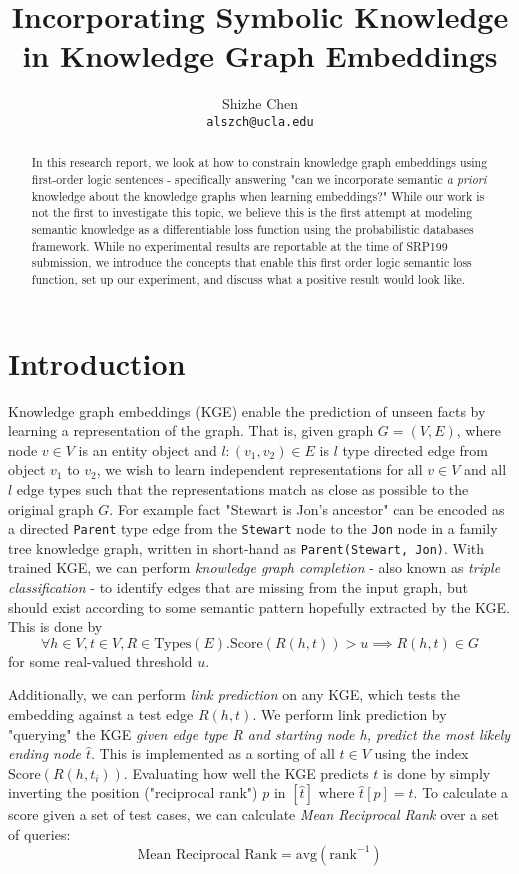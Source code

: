 \documentclass{article}
\title{Incorporating Symbolic Knowledge in Knowledge Graph Embeddings}
\author{%
  Shizhe Chen \\
  \texttt{alszch@ucla.edu} \\
}
\begin{document}
\maketitle

\begin{abstract}
    In this research report, we look at how to constrain knowledge graph
    embeddings using first-order logic sentences - specifically answering "can
    we incorporate semantic \textit{a priori} knowledge about the knowledge
    graphs when learning embeddings?" While our work is not the first to
    investigate this topic, we believe this is the first attempt at modeling
    semantic knowledge as a differentiable loss function using the probabilistic
    databases framework. While no experimental results are reportable at the
    time of SRP199 submission, we introduce the concepts that enable this first
    order logic semantic loss function, set up our experiment, and discuss what
    a positive result would look like.
\end{abstract}

\section{Introduction}
\label{Introduction}

Knowledge graph embeddings (KGE) enable the prediction of unseen facts by
learning a representation of the graph. That is, given graph \(G = (V, E)\),
where node \(v \in V\) is an entity object and \(l: (v_1, v_2) \in E\) is \(l\)
type directed edge from object \(v_1\) to \(v_2\), we wish to learn
independent representations for all \(v \in V\) and all \(l\) edge types such
that the representations match as close as possible to the original graph \(G\).
For example fact "Stewart is Jon's ancestor" can be encoded as a
directed \texttt{Parent} type edge from the \texttt{Stewart} node to the
\texttt{Jon} node in a family tree knowledge graph, written in short-hand as
\texttt{Parent(Stewart, Jon)}. With trained KGE, we can perform
\textit{knowledge graph completion} - also known as \textit{triple
classification} - to identify edges that are missing from the input graph, but
should exist according to some semantic pattern hopefully extracted by the KGE.
This is done by 
\[ \forall h \in V, t \in V, R \in \textrm{Types}(E).
    \textrm{Score}(R(h, t)) > u  \implies R(h, t) \in G \]
for some real-valued threshold \(u\).

Additionally, we can perform \textit{link prediction} on any KGE, which tests
the embedding against a test edge \(R(h, t)\). We perform link prediction by
"querying" the KGE \textit{given edge type \textrm{R} and starting node
\textrm{h}, predict the most likely ending node \(\hat{t}\)}. This is
implemented as a sorting of all \(t \in V\) using the index
\(\textrm{Score}({R(h, t_i)}) \).  Evaluating how well the KGE predicts \(t\) is
done by simply inverting the position ("reciprocal rank") \(p\) in \([\hat{t}]\)
where \(\hat{t}[p] = t\). To calculate a score given a set of test cases, we can
calculate \textit{Mean Reciprocal Rank} over a set of queries:
\[ \textrm{Mean Reciprocal Rank} = \textrm{avg}(\textrm{rank}^{-1}) \]
\end{document}
